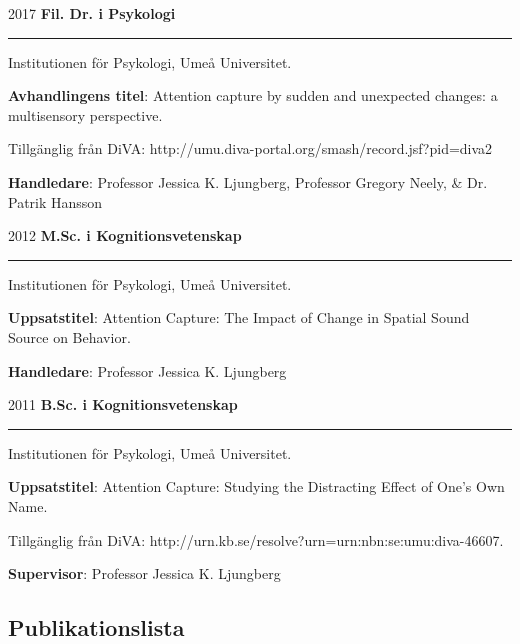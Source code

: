 \documentclass[]{article}
\begin{document}
2017 \hspace{1.5cm} \textbf{Fil. Dr. i Psykologi}\vspace{1mm}

\hrule

\begin{changemargin}{2.3cm}{2.4cm}

Institutionen för Psykologi, Umeå Universitet.

\textbf{Avhandlingens titel}: Attention capture by sudden and unexpected changes: a multisensory perspective. 

Tillgänglig från DiVA: \sloppy http://umu.diva-portal.org/smash/record.jsf?pid=diva2%

\textbf{Handledare}: Professor Jessica K. Ljungberg, Professor Gregory Neely, \& Dr. Patrik Hansson
\end{changemargin}

2012 \hspace{1.5cm}\textbf{M.Sc. i Kognitionsvetenskap}\vspace{1mm}

\hrule
\begin{changemargin}{2.3cm}{2.4cm}

Institutionen för Psykologi, Umeå Universitet.

\textbf{Uppsatstitel}: Attention Capture: The Impact of Change in Spatial Sound Source on Behavior. 
    
\textbf{Handledare}: Professor Jessica K. Ljungberg
\end{changemargin}

2011 \hspace{1.5cm}\textbf{B.Sc. i Kognitionsvetenskap}\vspace{1mm}

\hrule

\begin{changemargin}{2.3cm}{2.4cm}

Institutionen för Psykologi, Umeå Universitet.

\textbf{Uppsatstitel}:  Attention Capture: Studying the Distracting Effect of One’s Own Name.

Tillgänglig från DiVA: \sloppy http://urn.kb.se/resolve?urn=urn:nbn:se:umu:diva-46607.
    
\textbf{Supervisor}: Professor Jessica K. Ljungberg
\end{changemargin}

\hypertarget{publikationslista}{%
\subsection{Publikationslista}\label{publikationslista}}
\end{document}
